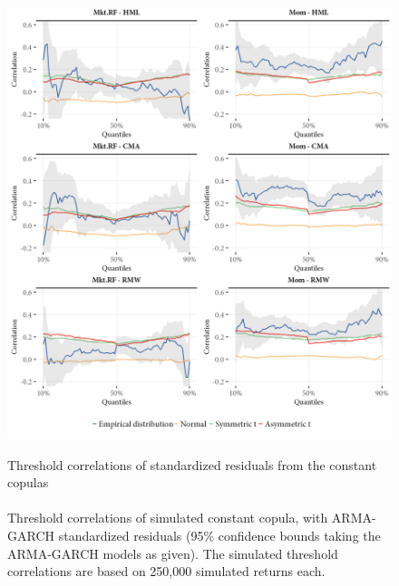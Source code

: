 \begin{figure}[!ht]
  \centering
  \caption{Threshold correlations of standardized residuals from the constant copulas \\ \quad \\ Threshold correlations of simulated constant copula, with ARMA-GARCH standardized residuals (95\% confidence bounds taking the ARMA-GARCH models as given). The simulated threshold correlations are based on 250,000 simulated returns each.}
  \includegraphics[scale=1]{graphics/threshold_simulated_1.png}  
  \label{fig:threshold_simulated1}
\end{figure}
\pagebreak
